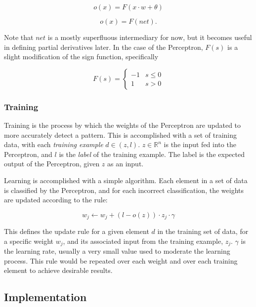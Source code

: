 \documentclass[a4paper, 11pt]{article} %
\begin{document}
\begin{equation}
o(x) = F(x \cdot w + \theta )
\end{equation}

\begin{equation}
o(x) = F(net) .
\end{equation}

Note that $net$ is a mostly superfluous intermediary for now, but it becomes useful in defining partial derivatives later.  In the case of the Perceptron, $F(s)$ is a slight modification of the sign function, specifically

\begin{equation}
F(s) = 
\begin{cases}
	-1 & s\leq 0 \\
	1        & s>0
\end{cases}
\end{equation}

\subsubsection*{Training}

Training is the process by which the weights of the Perceptron are updated to more accurately detect a pattern.  This is accomplished with a set of training data, with each \textit{training example} $d\in(z, l)$.  $z\in\mathbb{R}^{n}$ is the input fed into the Perceptron, and $l$ is the \textit{label} of the training example.  The label is the expected output of the Perceptron, given $z$ as an input.

Learning is accomplished with a simple algorithm.  Each element in a set of data is classified by the Perceptron, and for each incorrect classification, the weights are updated according to the rule:

\begin{equation}
w_j \leftarrow w_j + (l - o(z)) \cdot z_j \cdot \gamma
\end{equation}

This defines the update rule for a given element $d$ in the training set of data, for a specific weight $w_j$, and its associated input from the training example, $z_j$.  $\gamma$ is the learning rate, usually a very small value used to moderate the learning process.  This rule would be repeated over each weight and over each training element to achieve desirable results.

\subsection*{Implementation}
\end{document}
